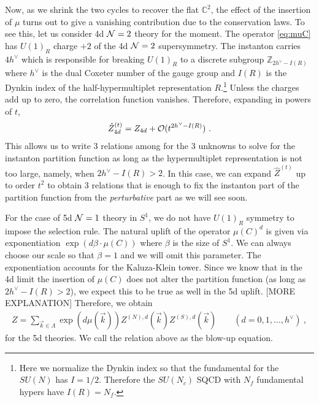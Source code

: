 \documentclass[letterpaper, 11pt]{article}
\def\IC{\mathbb{C}}
\def\IZ{\mathbb{Z}}
\def\CN{{\cal N}}
\def\CO{{\cal O}}
\begin{document}
Now, as we shrink the two cycles to recover the flat $\IC^2$, the effect of the insertion of $\mu$ turns out to give a vanishing contribution due to the conservation laws. 
To see this, let us consider 4d $\CN=2$ theory for the moment. The operator \eqref{eq:muC} has $U(1)_R$ charge $+2$ of the 4d $\CN=2$ supersymmetry. The instanton carries $4h^\vee$ which is responsible for breaking $U(1)_R$ to a discrete subgroup $\IZ_{2h^\vee - I(R)}$ where $h^\vee$ is the dual Coxeter number of the gauge group and $I(R)$ is the Dynkin index of the half-hypermultiplet representation $R$.\footnote{Here we normalize the Dynkin index so that the fundamental for the $SU(N)$ has $I=1/2$. Therefore the $SU(N_c)$ SQCD with $N_f$ fundamental hypers have $I(R) = N_f$.} Unless the charges add up to zero, the correlation function vanishes. Therefore, expanding in powers of $t$, 
\begin{align}
\hat{Z}_{4d}^{(t)} = Z_{4d} + \CO(t^{2h^\vee - I(R)})  \ . 
\end{align}
This allows us to write 3 relations among for the 3 unknowns to solve for the instanton partition function as long as the hypermultiplet representation is not too large, namely, when $2h^\vee - I(R) > 2$. In this case, we can expand $\hat{Z}^{(t)}$ up to order $t^2$ to obtain 3 relations that is enough to fix the instanton part of the partition function from the \emph{perturbative} part as we will see soon. 

For the case of 5d $\CN=1$ theory in $S^1$, we do not have $U(1)_R$ symmetry to impose the selection rule. The natural uplift of the operator $\mu(C)^d$ is given via exponentiation $\exp\left( d \beta \cdot \mu (C) \right)$ where $\beta$ is the size of $S^1$. We can always choose our scale so that $\beta = 1$ and we will omit this parameter. The exponentiation accounts for the Kaluza-Klein tower. Since we know that in the 4d limit the insertion of $\mu(C)$ does not alter the partition function (as long as $2h^\vee - I(R)>2$), we expect this to be true as well in the 5d uplift. 
[MORE EXPLANATION] 
Therefore, we obtain
\begin{align} \label{eq:blowup5d}
 Z = \sum_{\vec{k} \in \Lambda} \exp\left( d \mu(\vec{k}) \right) Z^{(N), d}(\vec{k})  Z^{(S), d}(\vec{k})  \qquad (d=0, 1, \ldots, h^\vee) \ , 
\end{align} 
for the 5d theories. We call the relation above as the blow-up equation. 
\end{document}
